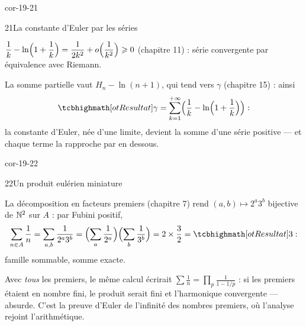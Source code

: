 \begin{blocLivre}{cor-19-21}
\begin{corrige}{21}{La constante d'Euler par les séries}
\begin{questions}
  \item $\dfrac1k-\ln\Bigl(1+\dfrac1k\Bigr)
    =\dfrac{1}{2k^{2}}+o\Bigl(\dfrac{1}{k^{2}}\Bigr)\geqslant0$
    (chapitre 11) : série convergente par équivalence avec Riemann.
  \item La somme partielle vaut $H_n-\ln(n+1)$, qui tend vers
    $\gamma$ (chapitre 15) : ainsi
    \[
    \res{\gamma=\sum_{k=1}^{+\infty}\Bigl(\frac1k
    -\ln\Bigl(1+\frac1k\Bigr)\Bigr)} :
    \]
    la constante d'Euler, née d'une limite, devient la somme d'une série
    positive — et chaque terme la rapproche par en dessous.
\end{questions}
\end{corrige}
\end{blocLivre}

\begin{blocLivre}{cor-19-22}
\begin{corrige}{22}{Un produit eulérien miniature}
\begin{questions}
  \item La décomposition en facteurs premiers (chapitre 7) rend
    $(a,b)\mapsto2^{a}3^{b}$ bijective de $\mathbb{N}^{2}$ sur $A$ : par Fubini
    positif,
    \[
    \sum_{n\in A}\frac1n=\sum_{a,b}\frac{1}{2^{a}3^{b}}
    =\Bigl(\sum_a\frac{1}{2^{a}}\Bigr)\Bigl(\sum_b\frac{1}{3^{b}}\Bigr)
    =2\times\frac32=\res{3} :
    \]
    famille sommable, somme exacte.
  \item Avec \emph{tous} les premiers, le même calcul écrirait
    $\sum\frac1n=\prod_p\frac{1}{1-1/p}$ : si les premiers étaient en
    nombre fini, le produit serait fini et l'harmonique convergente —
    absurde. C'est la preuve d'Euler de l'infinité des nombres premiers,
    où l'analyse rejoint l'arithmétique.
\end{questions}
\end{corrige}
\end{blocLivre}

